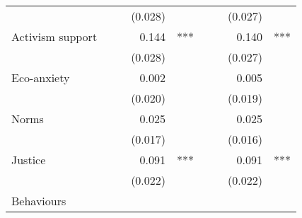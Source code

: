 \documentclass{article}
\begin{document}
\begin{table}[!h]
\begin{tabular}{lllllllll}
\multicolumn{1}{l}{} &
  \multicolumn{1}{r}{} &
  \multicolumn{1}{l}{} &
  \multicolumn{1}{r}{(0.028)} &
  \multicolumn{1}{l}{} &
  \multicolumn{1}{r}{} &
  \multicolumn{1}{l}{} &
  \multicolumn{1}{r}{(0.027)} &
  \multicolumn{1}{l}{} \\
\multicolumn{1}{l}{Activism support} &
  \multicolumn{1}{r}{} &
  \multicolumn{1}{l}{} &
  \multicolumn{1}{r}{0.144} &
  \multicolumn{1}{l}{***} &
  \multicolumn{1}{r}{} &
  \multicolumn{1}{l}{} &
  \multicolumn{1}{r}{0.140} &
  \multicolumn{1}{l}{***} \\
\multicolumn{1}{l}{} &
  \multicolumn{1}{r}{} &
  \multicolumn{1}{l}{} &
  \multicolumn{1}{r}{(0.028)} &
  \multicolumn{1}{l}{} &
  \multicolumn{1}{r}{} &
  \multicolumn{1}{l}{} &
  \multicolumn{1}{r}{(0.027)} &
  \multicolumn{1}{l}{} \\
\multicolumn{1}{l}{Eco-anxiety} &
  \multicolumn{1}{r}{} &
  \multicolumn{1}{l}{} &
  \multicolumn{1}{r}{0.002} &
  \multicolumn{1}{l}{} &
  \multicolumn{1}{r}{} &
  \multicolumn{1}{l}{} &
  \multicolumn{1}{r}{0.005} &
  \multicolumn{1}{l}{} \\
\multicolumn{1}{l}{} &
  \multicolumn{1}{r}{} &
  \multicolumn{1}{l}{} &
  \multicolumn{1}{r}{(0.020)} &
  \multicolumn{1}{l}{} &
  \multicolumn{1}{r}{} &
  \multicolumn{1}{l}{} &
  \multicolumn{1}{r}{(0.019)} &
  \multicolumn{1}{l}{} \\
\multicolumn{1}{l}{Norms} &
  \multicolumn{1}{r}{} &
  \multicolumn{1}{l}{} &
  \multicolumn{1}{r}{0.025} &
  \multicolumn{1}{l}{} &
  \multicolumn{1}{r}{} &
  \multicolumn{1}{l}{} &
  \multicolumn{1}{r}{0.025} &
  \multicolumn{1}{l}{} \\
\multicolumn{1}{l}{} &
  \multicolumn{1}{r}{} &
  \multicolumn{1}{l}{} &
  \multicolumn{1}{r}{(0.017)} &
  \multicolumn{1}{l}{} &
  \multicolumn{1}{r}{} &
  \multicolumn{1}{l}{} &
  \multicolumn{1}{r}{(0.016)} &
  \multicolumn{1}{l}{} \\
\multicolumn{1}{l}{Justice} &
  \multicolumn{1}{r}{} &
  \multicolumn{1}{l}{} &
  \multicolumn{1}{r}{0.091} &
  \multicolumn{1}{l}{***} &
  \multicolumn{1}{r}{} &
  \multicolumn{1}{l}{} &
  \multicolumn{1}{r}{0.091} &
  \multicolumn{1}{l}{***} \\
\multicolumn{1}{l}{} &
  \multicolumn{1}{r}{} &
  \multicolumn{1}{l}{} &
  \multicolumn{1}{r}{(0.022)} &
  \multicolumn{1}{l}{} &
  \multicolumn{1}{r}{} &
  \multicolumn{1}{l}{} &
  \multicolumn{1}{r}{(0.022)} &
  \multicolumn{1}{l}{} \\
\multicolumn{1}{l}{Behaviours} &
  \multicolumn{1}{r}{} &
  \multicolumn{1}{l}{} &

\end{tabular}
\end{table}
\end{document}

